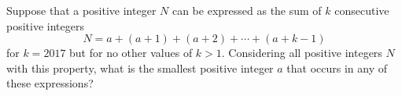 Suppose that a positive integer $N$ can be expressed as the sum of $k$ consecutive positive integers
\[
N = a + (a+1) +(a+2) + \cdots + (a+k-1)
\]
for $k=2017$ but for no other values of $k>1$. Considering all positive integers $N$ with this property,
what is the smallest positive integer $a$ that occurs in any of these expressions?

